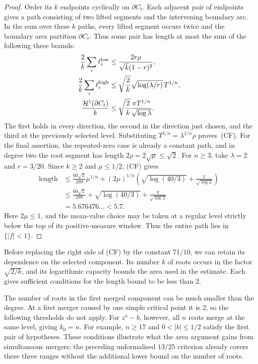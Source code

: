 \documentclass[11pt]{article}
\begin{document}
\begin{proof}
Order its $k$ endpoints cyclically on $\partial C_t$. Each adjacent pair
of endpoints gives a path consisting of two lifted segments and the
intervening boundary arc. In the sum over these $k$ paths, every lifted
segment occurs twice and the boundary arcs partition $\partial C_t$.
Thus some pair has length at most the sum of the following three bounds:
\[
\begin{aligned}
 \frac2k\sum_i\ell_i^{\rm low}
 &\le\frac{2r\rho}{\sqrt{k}(1-r)^2},\\
 \frac2k\sum_i\ell_i^{\rm high}
 &\le\sqrt{\frac2k}\sqrt{\log(\lambda/r)}\,T^{1/n},\\
 \frac{\mathcal H^1(\partial C_t)}k
 &\le\sqrt{\frac2k}\frac{\pi T^{1/n}}{\sqrt{\log\lambda}}.
\end{aligned}
\]
The first holds in every direction, the second in the direction just
chosen, and the third at the previously selected level. Substituting
$T^{1/n}=\lambda^{1/n}\rho$ proves~(CF).
For the final assertion, the repeated-zero case is already a constant path,
and in degree two the root segment has length
$2\rho=2\sqrt\mu\le\sqrt2$.  For $n\ge3$, take $\lambda=2$ and $r=3/20$.
Since $k\ge2$ and $\mu\le1/2$, (CF) gives
\[
 \begin{aligned}
 \operatorname{length}
 &\le \frac{60\sqrt2}{289}\mu^{1/n}
 +(2\mu)^{1/n}\left(
   \sqrt{\log(40/3)}+\frac{\pi}{\sqrt{\log2}}
 \right)\\
 &\le \frac{60\sqrt2}{289}+\sqrt{\log(40/3)}
      +\frac{\pi}{\sqrt{\log2}}\\
 &=5.676476\ldots<5.7.
 \end{aligned}
\]
Here $2\mu\le1$, and the mean-value choice may be taken at a regular level
strictly below the top of its positive-measure window.  Thus the entire path
lies in $\{|f|<1\}$.
\end{proof}

Before replacing the right side of (CF) by the constant $71/10$, we can
retain its dependence on the selected component. Its number $k$ of
roots occurs in the factor $\sqrt{2/k}$, and its logarithmic capacity
bounds the area used in the estimate. Each gives sufficient conditions
for the length bound to be less than $2$.

The number of roots in the first merged component can be much smaller
than the degree. At a first merger caused by one simple critical point it
is $2$, so the following thresholds do not apply. For $z^n-b$, however,
all $n$ roots merge at the same level, giving $k_0=n$. For example,
$n\ge17$ and $0<|b|\le1/2$ satisfy the first pair of hypotheses. These
conditions illustrate what the area argument gains from simultaneous
mergers; the preceding unformalised $13/25$ criterion already covers these three ranges
without the additional lower bound on the number of roots.
\end{document}
